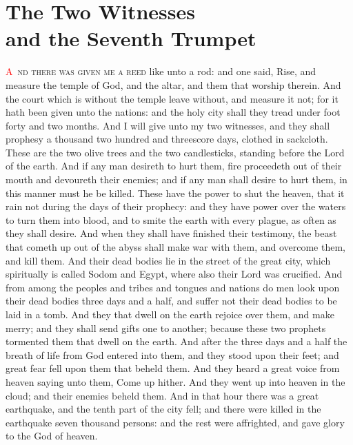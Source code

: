 
\chapter{The Two Witnesses \\and the Seventh Trumpet}
\lettrine[lines=3,slope=-0.5em]{\textcolor{red}{A}}{\ nd there was given me a reed} like unto a rod: and one said, Rise, and measure the temple of God, and the altar, and them that worship therein. 
 And the court which is without the temple leave without, and measure it not; for it hath been given unto the nations: and the holy city shall they tread under foot forty and two months. 
 And I will give unto my two witnesses, and they shall prophesy a thousand two hundred and threescore days, clothed in sackcloth. 
 These are the two olive trees and the two candlesticks, standing before the Lord of the earth. 
 And if any man desireth to hurt them, fire proceedeth out of their mouth and devoureth their enemies; and if any man shall desire to hurt them, in this manner must he be killed. 
 These have the power to shut the heaven, that it rain not during the days of their prophecy: and they have power over the waters to turn them into blood, and to smite the earth with every plague, as often as they shall desire. 
 And when they shall have finished their testimony, the beast that cometh up out of the abyss shall make war with them, and overcome them, and kill them. 
 And their dead bodies lie in the street of the great city, which spiritually is called Sodom and Egypt, where also their Lord was crucified. 
 And from among the peoples and tribes and tongues and nations do men look upon their dead bodies three days and a half, and suffer not their dead bodies to be laid in a tomb. 
 And they that dwell on the earth rejoice over them, and make merry; and they shall send gifts one to another; because these two prophets tormented them that dwell on the earth. 
 And after the three days and a half the breath of life from God entered into them, and they stood upon their feet; and great fear fell upon them that beheld them. 
 And they heard a great voice from heaven saying unto them, Come up hither. And they went up into heaven in the cloud; and their enemies beheld them. 
 And in that hour there was a great earthquake, and the tenth part of the city fell; and there were killed in the earthquake seven thousand persons: and the rest were affrighted, and gave glory to the God of heaven.

